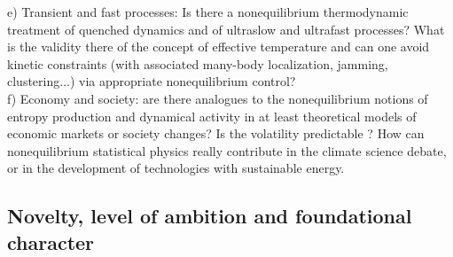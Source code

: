 e) Transient and fast processes: Is there a nonequilibrium thermodynamic treatment of quenched dynamics and of ultraslow and ultrafast processes?  What is the validity there of the concept of effective temperature and can one avoid kinetic constraints (with associated many-body localization, jamming, clustering...) via appropriate nonequilibrium control?\\
f) Economy and society: are there analogues to the nonequilibrium notions of entropy production and dynamical activity in at least theoretical models of economic markets or society changes?  Is the volatility predictable ?  How can nonequilibrium statistical physics really contribute in the climate science debate, or in the development of technologies with  sustainable energy.


\subsection{Novelty, level of ambition and foundational character}\label{sec:progress}


